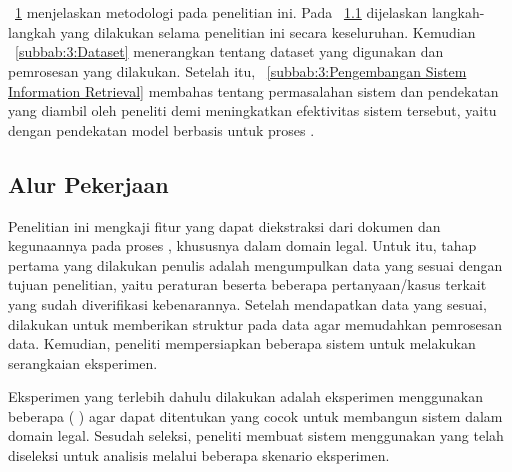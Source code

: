 \chapter{\babTiga}
\label{bab:3}
\bab{}~\ref{bab:3} menjelaskan metodologi pada penelitian ini. Pada \subbab{}~\ref{subbab:3:Alur Pekerjaan} dijelaskan langkah-langkah yang dilakukan selama penelitian ini secara keseluruhan.  Kemudian \subbab{}~\ref{subbab:3:Dataset} menerangkan tentang dataset yang digunakan dan pemrosesan yang dilakukan. Setelah itu, \subbab{}~\ref{subbab:3:Pengembangan Sistem Information Retrieval} membahas tentang permasalahan sistem \ir{} dan pendekatan yang diambil oleh peneliti demi meningkatkan efektivitas sistem \ir{} tersebut, yaitu dengan pendekatan model \ml{} berbasis \hcf{} untuk proses \reranking{}.





\section{Alur Pekerjaan}
\label{subbab:3:Alur Pekerjaan}
Penelitian ini mengkaji fitur yang dapat diekstraksi dari dokumen dan kegunaannya pada proses \reranking{}, khususnya dalam domain legal. Untuk itu, tahap pertama yang dilakukan penulis adalah mengumpulkan data yang sesuai dengan tujuan penelitian, yaitu peraturan beserta beberapa pertanyaan/kasus terkait yang sudah diverifikasi kebenarannya. Setelah mendapatkan data yang sesuai, dilakukan \parsing{} untuk memberikan struktur pada data agar memudahkan pemrosesan data. Kemudian, peneliti mempersiapkan beberapa sistem \ir{} untuk melakukan serangkaian eksperimen.

Eksperimen yang terlebih dahulu dilakukan adalah eksperimen menggunakan beberapa \txt{} \matching{} \alg{} (\base{} \retriever{}) agar dapat ditentukan yang cocok untuk membangun sistem \ir{} dalam domain legal. Sesudah seleksi, peneliti membuat sistem \ir{} menggunakan \base{} \retriever{} yang telah diseleksi untuk analisis melalui beberapa skenario eksperimen.
